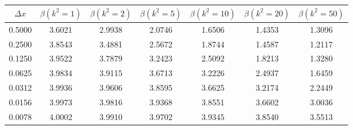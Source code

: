 \begin{tabular}{|c|c|c|c|c|c|c|}
\hline
\textbf{$\Delta x$}&\textbf{$\beta(k^2=1)$}&\textbf{$\beta(k^2=2)$}&\textbf{$\beta(k^2=5)$}&\textbf{$\beta(k^2=10)$}&\textbf{$\beta(k^2=20)$}&\textbf{$\beta(k^2=50)$}\\\hline
0.5000&3.6021&2.9938&2.0746&1.6506&1.4353&1.3096\\\hline
0.2500&3.8543&3.4881&2.5672&1.8744&1.4587&1.2117\\\hline
0.1250&3.9522&3.7879&3.2423&2.5092&1.8213&1.3280\\\hline
0.0625&3.9834&3.9115&3.6713&3.2226&2.4937&1.6459\\\hline
0.0312&3.9936&3.9606&3.8595&3.6625&3.2174&2.2449\\\hline
0.0156&3.9973&3.9816&3.9368&3.8551&3.6602&3.0036\\\hline
0.0078&4.0002&3.9910&3.9702&3.9345&3.8540&3.5513\\\hline
\end{tabular}
